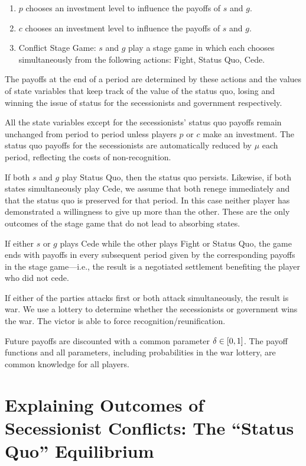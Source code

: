 \begin{enumerate} 
\item $p$ chooses an investment level to influence the payoffs of $s$ and $g$. 
 
\item $c$ chooses an investment level to influence the payoffs of $s$ and $g$.
 
\item Conflict Stage Game: $s$ and $g$ play a stage game in which each chooses simultaneously from the following actions: Fight, Status Quo, Cede. 
\end{enumerate}

The payoffs at the end of a period are determined by these actions and the values of state variables that keep track of the value of the status quo, losing and winning the issue of status for the secessionists and government respectively. 

All the state variables except for the secessionists' status quo payoffs remain unchanged from period to period unless players $p$ or $c$ make an investment. The status quo payoffs for the secessionists are automatically reduced by $\mu$ each period, reflecting the costs of non-recognition.

If both $s$ and $g$ play Status Quo, then the status quo persists. Likewise, if both states simultaneously play Cede, we assume that both renege immediately and that the status quo is preserved for that period. In this case neither player has demonstrated a willingness to give up more than the other. These are the only outcomes of the stage game that do not lead to absorbing states. 

If either $s$ or $g$ plays Cede while the other plays Fight or Status Quo, the game ends with payoffs in every subsequent period given by the corresponding payoffs in the stage game---i.e., the result is a negotiated settlement benefiting the player who did not cede. 

If either of the parties attacks first or both attack simultaneously, the result is war. We use a lottery to determine whether the secessionists or government wins the war. The victor is able to force recognition/reunification.

Future payoffs are discounted with a common parameter $\delta \in [0,1]$. The payoff functions and all parameters, including probabilities in the war lottery, are common knowledge for all players.




\section{Explaining Outcomes of Secessionist Conflicts: The ``Status Quo'' Equilibrium} 
\label{sec:main}

